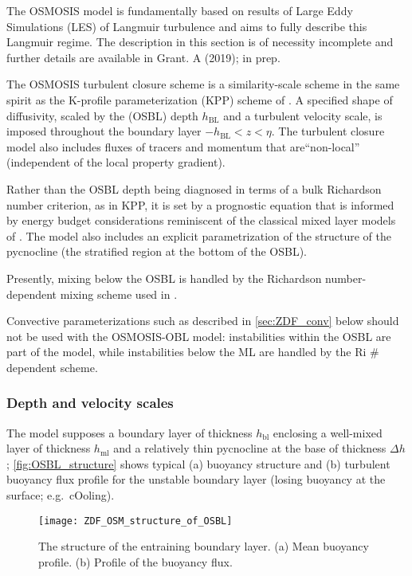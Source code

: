 \documentclass[../main/NEMO_manual]{subfiles}
\begin{document}
The OSMOSIS model is fundamentally based on results of Large Eddy
Simulations (LES) of Langmuir turbulence and aims to fully describe
this Langmuir regime. The description in this section is of necessity incomplete and further details are available in Grant. A (2019); in prep.

The OSMOSIS turbulent closure scheme is a similarity-scale scheme in
the same spirit as the K-profile
parameterization (KPP) scheme of \citet{large.mcwilliams.ea_RG94}.
A specified shape of diffusivity, scaled by the (OSBL) depth
$h_{\mathrm{BL}}$ and a turbulent velocity scale, is imposed throughout the
boundary layer
$-h_{\mathrm{BL}}<z<\eta$. The turbulent closure model
also includes fluxes of tracers and momentum that are``non-local'' (independent of the local property gradient).

Rather than the OSBL
depth being diagnosed in terms of a bulk Richardson number criterion,
as in KPP, it is set by a prognostic equation that is informed by
energy budget considerations reminiscent of the classical mixed layer
models of \citet{kraus.turner_T67}.
The model also includes an explicit parametrization of the structure
of the pycnocline (the stratified region at the bottom of the OSBL).

Presently, mixing below the OSBL is handled by the Richardson
number-dependent mixing scheme used in \citet{large.mcwilliams.ea_RG94}.

Convective parameterizations such as described in \autoref{sec:ZDF_conv}
below should not be used with the OSMOSIS-OBL model: instabilities
within the OSBL are part of the model, while instabilities below the
ML are handled by the Ri \# dependent scheme.

\subsubsection{Depth and velocity scales}

The model supposes a boundary layer of thickness $h_{\mathrm{bl}}$ enclosing a well-mixed
layer of thickness $h_{\mathrm{ml}}$ and a relatively thin pycnocline at the base of
thickness $\Delta h$; \autoref{fig:OSBL_structure} shows typical (a) buoyancy structure
and (b) turbulent buoyancy flux profile for the unstable boundary layer (losing buoyancy
at the surface; e.g.\ cOoling).

\begin{figure}[!t]
  \begin{center}
    \texttt{[image: ZDF\_OSM\_structure\_of\_OSBL]}
    \caption{
      \protect\label{fig:OSBL_structure}
     The structure of the entraining  boundary layer. (a) Mean buoyancy profile. (b) Profile of the buoyancy flux.
    }
  \end{center}
\end{figure}
\end{document}
